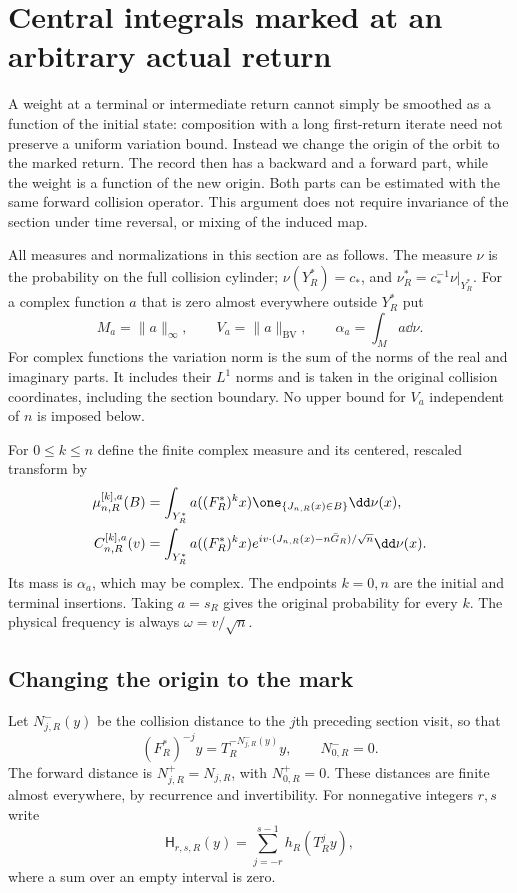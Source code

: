 \section{Central integrals marked at an arbitrary actual return}
\label{sec:marked-return-band}
A weight at a terminal or intermediate return cannot simply be smoothed
as a function of the initial state: composition with a long first-return
iterate need not preserve a uniform variation bound. Instead we change
the origin of the orbit to the marked return. The record then has a
backward and a forward part, while the weight is a function of the new
origin. Both parts can be estimated with the same forward collision
operator. This argument does not require invariance of the section under
time reversal, or mixing of the induced map.

All measures and normalizations in this section are as follows. The
measure $\nu$ is the probability on the full collision cylinder;
$\nu(Y_R^*)=c_*$, and $\nu_R^*=c_*^{-1}\nu|_{Y_R^*}$. For a complex
function $a$ that is zero almost everywhere outside $Y_R^*$ put
\begin{equation}\label{eq:marked-norms}
 M_a=\|a\|_\infty,\qquad V_a=\|a\|_{\mathrm{BV}},\qquad
 \alpha_a=\int_M a\dd\nu.
\end{equation}
For complex functions the variation norm is the sum of the norms of the
real and imaginary parts. It includes their $L^1$ norms and is taken
in the original collision coordinates, including the section boundary.
No upper bound for $V_a$ independent of $n$ is imposed below.

For $0\le k\le n$ define the finite complex measure and its centered,
rescaled transform by
\begin{align}
 \mu^{[k],a}_{n,R}(B)
   &=\int_{Y_R^*}a((F_R^*)^kx)\one_{\{J_{n,R}(x)\in B\}}\dd\nu(x),
       \label{eq:marked-measure}\\
 C^{[k],a}_{n,R}(v)
   &=\int_{Y_R^*}a((F_R^*)^kx)
          e^{iv\cdot(J_{n,R}(x)-n\bar G_R)/\sqrt n}\dd\nu(x).
       \label{eq:marked-transform}
\end{align}
Its mass is $\alpha_a$, which may be complex. The endpoints $k=0,n$
are the initial and terminal insertions. Taking $a=s_R$ gives the
original probability for every $k$. The physical frequency is always
$\omega=v/\sqrt n$.

\subsection{Changing the origin to the mark}
Let $N^-_{j,R}(y)$ be the collision distance to the $j$th preceding
section visit, so that
\[
 (F_R^*)^{-j}y=T_R^{-N^-_{j,R}(y)}y,\qquad N^-_{0,R}=0.
\]
The forward distance is $N^+_{j,R}=N_{j,R}$, with $N^+_{0,R}=0$.
These distances are finite almost everywhere, by recurrence and
invertibility. For nonnegative integers $r,s$ write
\begin{equation}\label{eq:two-sided-collision-sum}
 \mathsf H_{r,s,R}(y)=\sum_{j=-r}^{s-1}h_R(T_R^jy),
\end{equation}
where a sum over an empty interval is zero.

